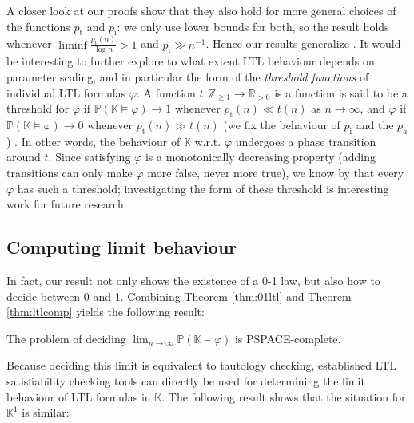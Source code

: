 \documentclass[runngingheads]{llncs}
\newcommand\recht\operatorname
\begin{document}
\begin{remark}
A closer look at our proofs show that they also hold for more general choices of the functions $p_{\recht{t}}$ and $p_{\recht{i}}$: we only use lower bounds for both, so the result holds whenever $\liminf \tfrac{p_{\recht{t}}(n)}{\log n} > 1$ and $p_{\recht{i}} \gg n^{-1}$. Hence our results generalize \cite{dong20250}. It would be interesting to further explore to what extent LTL behaviour depends on parameter scaling, and in particular the form of the \emph{threshold functions} of individual LTL formulas $\varphi$: A function $t\colon \mathbb{Z}_{\geq 1} \rightarrow \mathbb{R}_{>0}$ is a function is said to be a threshold for $\varphi$ if $\mathbb{P}(\mathbb{K}\models \varphi) \rightarrow 1$ whenever $p_{\recht{t}}(n) \ll t(n)$ as $n \rightarrow \infty$, and $\varphi$ if $\mathbb{P}(\mathbb{K}\models \varphi) \rightarrow 0$ whenever $p_{\recht{t}}(n) \gg t(n)$ (we fix the behaviour of $p_{\recht{i}}$ and the $p_a$) \cite{bollobas1987threshold}. In other words, the behaviour of $\mathbb{K}$ w.r.t. $\varphi$ undergoes a phase transition around $t$. Since satisfying $\varphi$ is a monotonically decreasing property (adding transitions can only make $\varphi$ more false, never more true), we know by \cite{bollobas1987threshold} that every $\varphi$ has such a threshold; investigating the form of these threshold is interesting work for future research.
\end{remark}

\subsection{Computing limit behaviour}

In fact, our result not only shows the existence of a 0-1 law, but also how to decide between 0 and 1. Combining Theorem \ref{thm:01ltl} and Theorem \ref{thm:ltlcomp} yields the following result:

\begin{corollary}
The problem of deciding $\lim_{n \rightarrow \infty} \mathbb{P}(\mathbb{K} \models \varphi)$ is PSPACE-complete.
\end{corollary}

Because deciding this limit is equivalent to tautology checking, established LTL satisfiability checking tools \cite{rozier2007ltl,li2014aalta,geatti2024sat} can directly be used for determining the limit behaviour of LTL formulas in $\mathbb{K}$. The following result shows that the situation for $\mathbb{K}^1$ is similar:
\end{document}
